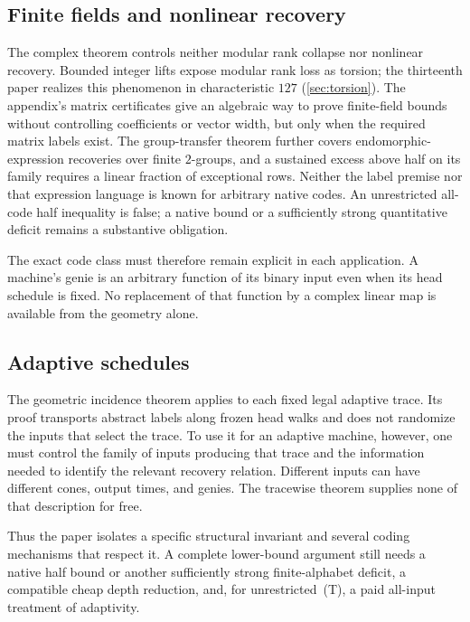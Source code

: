 \subsection{Finite fields and nonlinear recovery}
The complex theorem controls neither modular rank collapse nor nonlinear recovery. Bounded integer lifts expose modular rank loss as torsion; the thirteenth paper realizes this phenomenon in characteristic $127$ (\cref{sec:torsion}). The appendix's matrix certificates give an algebraic way to prove finite-field bounds without controlling coefficients or vector width, but only when the required matrix labels exist. The group-transfer theorem further covers endomorphic-expression recoveries over finite $2$-groups, and a sustained excess above half on its family requires a linear fraction of exceptional rows. Neither the label premise nor that expression language is known for arbitrary native codes. An unrestricted all-code half inequality is false; a native bound or a sufficiently strong quantitative deficit remains a substantive obligation.

The exact code class must therefore remain explicit in each application. A machine's genie is an arbitrary function of its binary input even when its head schedule is fixed. No replacement of that function by a complex linear map is available from the geometry alone.

\subsection{Adaptive schedules}
The geometric incidence theorem applies to each fixed legal adaptive trace. Its proof transports abstract labels along frozen head walks and does not randomize the inputs that select the trace. To use it for an adaptive machine, however, one must control the family of inputs producing that trace and the information needed to identify the relevant recovery relation. Different inputs can have different cones, output times, and genies. The tracewise theorem supplies none of that description for free.

Thus the paper isolates a specific structural invariant and several coding mechanisms that respect it. A complete lower-bound argument still needs a native half bound or another sufficiently strong finite-alphabet deficit, a compatible cheap depth reduction, and, for unrestricted~(T), a paid all-input treatment of adaptivity.
